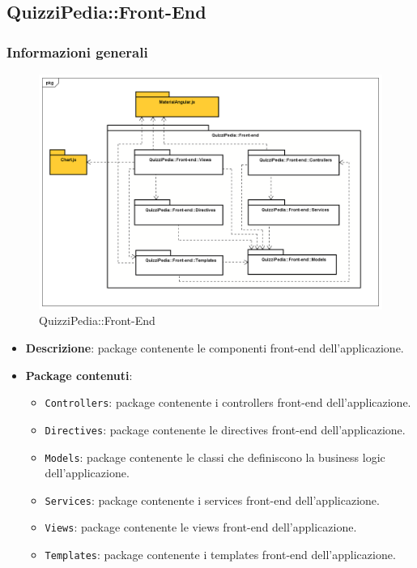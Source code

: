 \subsection{QuizziPedia::Front-End}
\subsubsection{Informazioni generali}
\label{QuizziPedia::Front-End}
\begin{figure}[ht]
	\centering
	\includegraphics[scale=0.45]{UML/Package/QuizziPedia_Front-end.png}
	\caption{QuizziPedia::Front-End}
\end{figure}
\FloatBarrier
	\begin{itemize}
		\item \textbf{Descrizione}: package contenente le componenti front-end dell'applicazione.
		\item \textbf{Package contenuti}:
		\begin{itemize}
			\item \texttt{Controllers}: package contenente i controllers front-end dell'applicazione.
			\item \texttt{Directives}: package contenente le directives front-end dell'applicazione.
			\item \texttt{Models}: package contenente le classi che definiscono la business logic dell'applicazione.
			\item \texttt{Services}: package contenente i services front-end dell'applicazione.
			\item \texttt{Views}: package contenente le views front-end dell'applicazione.
			\item \texttt{Templates}: package contenente i templates front-end dell'applicazione.
		\end{itemize}
	\end{itemize}
	